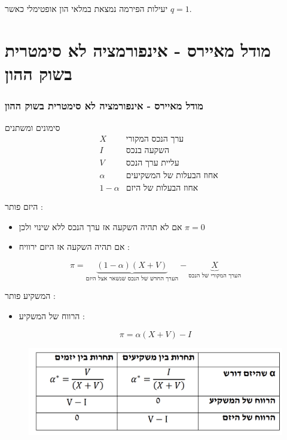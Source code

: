 \documentclass[usenames,dvipsnames]{beamer}
\begin{document}
\begin{RTL}
\begin{frame}[allowframebreaks]
    \begin{alertblock}{יעילות}
        הפירמה נמצאת במלאי הון אופטימלי כאשר $q = 1$.
    \end{alertblock}
\end{frame}
\section{מודל מאיירס - אינפורמציה לא סימטרית בשוק ההון}
\begin{frame}[allowframebreaks]
    \frametitle{מודל מאיירס - אינפורמציה לא סימטרית בשוק ההון}
    \begin{block}{סימונים ומשתנים}
        \begin{align*}
             & X & \text{ערך הנכס המקורי} \\ & I & \text{השקעה בנכס} \\ & V & \text{עליית ערך הנכס} \\ & \alpha & \text{אחוז הבעלות של המשקיעים} \\ & 1-\alpha & \text{אחוז הבעלות של היזם}
         \end{align*}
    \end{block}
    \framebreak
    היזם פותר :
    \begin{itemize}
        \item אם לא תהיה השקעה אז ערך הנכס ללא שינוי ולכן $\pi = 0$
        \item אם תהיה השקעה אז היזם ירוויח : 
    \end{itemize}
    $$\pi = \underbrace{(1-\alpha)\left(X+V\right)}_{\text{הערך החדש של הנכס שנשאר אצל היזם}} - \underbrace{X}_{\text{הערך המקורי של הנכס}}$$
    
    המשקיע פותר : \\
    \begin{itemize}
        \item  הרווח של המשקיע :
    \end{itemize}
    $$\pi = \alpha(X+V) - I$$
    \begin{figure}
        \centering
        \includegraphics[width=\textwidth]{images/Screenshot 2023-12-03 at 19.35.55.png}
    \end{figure}


\end{frame}
\end{RTL}
\end{document}
